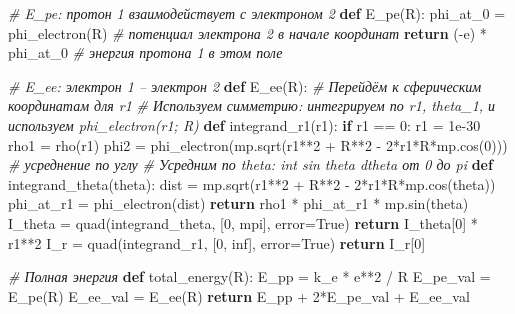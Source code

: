 \documentclass[11pt]{article}
\newenvironment{Shaded}{}{}
\newcommand{\KeywordTok}[1]{\textcolor[rgb]{0.00,0.44,0.13}{\textbf{{#1}}}}
\newcommand{\DecValTok}[1]{\textcolor[rgb]{0.25,0.63,0.44}{{#1}}}
\newcommand{\FloatTok}[1]{\textcolor[rgb]{0.25,0.63,0.44}{{#1}}}
\newcommand{\CommentTok}[1]{\textcolor[rgb]{0.38,0.63,0.69}{\textit{{#1}}}}
\newcommand{\NormalTok}[1]{{#1}}
\newcommand{\VariableTok}[1]{\textcolor[rgb]{0.10,0.09,0.49}{{#1}}}
\newcommand{\ControlFlowTok}[1]{\textcolor[rgb]{0.00,0.44,0.13}{\textbf{{#1}}}}
\newcommand{\OperatorTok}[1]{\textcolor[rgb]{0.40,0.40,0.40}{{#1}}}
\begin{document}
\begin{Shaded}
\begin{Highlighting}[]
\CommentTok{# E_pe: протон 1 взаимодействует с электроном 2}
\KeywordTok{def}\NormalTok{ E_pe(R):}
\NormalTok{    phi_at_0 }\OperatorTok{=}\NormalTok{ phi_electron(R)  }\CommentTok{# потенциал электрона 2 в начале координат}
    \ControlFlowTok{return}\NormalTok{ (}\OperatorTok{-}\NormalTok{e) }\OperatorTok{*}\NormalTok{ phi_at_0  }\CommentTok{# энергия протона 1 в этом поле}

\CommentTok{# E_ee: электрон 1 – электрон 2}
\KeywordTok{def}\NormalTok{ E_ee(R):}
    \CommentTok{# Перейдём к сферическим координатам для r1}
    \CommentTok{# Используем симметрию: интегрируем по r1, theta_1, и используем phi_electron(r1; R)}
    \KeywordTok{def}\NormalTok{ integrand_r1(r1):}
        \ControlFlowTok{if}\NormalTok{ r1 }\OperatorTok{==} \DecValTok{0}\NormalTok{:}
\NormalTok{            r1 }\OperatorTok{=} \FloatTok{1e-30}
\NormalTok{        rho1 }\OperatorTok{=}\NormalTok{ rho(r1)}
\NormalTok{        phi2 }\OperatorTok{=}\NormalTok{ phi_electron(mp.sqrt(r1}\OperatorTok{**}\DecValTok{2} \OperatorTok{+}\NormalTok{ R}\OperatorTok{**}\DecValTok{2} \OperatorTok{-} \DecValTok{2}\OperatorTok{*}\NormalTok{r1}\OperatorTok{*}\NormalTok{R}\OperatorTok{*}\NormalTok{mp.cos(}\DecValTok{0}\NormalTok{)))  }\CommentTok{# усреднение по углу}
        \CommentTok{# Усредним по theta: int sin theta dtheta от 0 до pi}
        \KeywordTok{def}\NormalTok{ integrand_theta(theta):}
\NormalTok{            dist }\OperatorTok{=}\NormalTok{ mp.sqrt(r1}\OperatorTok{**}\DecValTok{2} \OperatorTok{+}\NormalTok{ R}\OperatorTok{**}\DecValTok{2} \OperatorTok{-} \DecValTok{2}\OperatorTok{*}\NormalTok{r1}\OperatorTok{*}\NormalTok{R}\OperatorTok{*}\NormalTok{mp.cos(theta))}
\NormalTok{            phi_at_r1 }\OperatorTok{=}\NormalTok{ phi_electron(dist)}
            \ControlFlowTok{return}\NormalTok{ rho1 }\OperatorTok{*}\NormalTok{ phi_at_r1 }\OperatorTok{*}\NormalTok{ mp.sin(theta)}
\NormalTok{        I_theta }\OperatorTok{=}\NormalTok{ quad(integrand_theta, [}\DecValTok{0}\NormalTok{, mpi], error}\OperatorTok{=}\VariableTok{True}\NormalTok{)}
        \ControlFlowTok{return}\NormalTok{ I_theta[}\DecValTok{0}\NormalTok{] }\OperatorTok{*}\NormalTok{ r1}\OperatorTok{**}\DecValTok{2}
\NormalTok{    I_r }\OperatorTok{=}\NormalTok{ quad(integrand_r1, [}\DecValTok{0}\NormalTok{, inf], error}\OperatorTok{=}\VariableTok{True}\NormalTok{)}
    \ControlFlowTok{return}\NormalTok{ I_r[}\DecValTok{0}\NormalTok{]}

\CommentTok{# Полная энергия}
\KeywordTok{def}\NormalTok{ total_energy(R):}
\NormalTok{    E_pp }\OperatorTok{=}\NormalTok{ k_e }\OperatorTok{*}\NormalTok{ e}\OperatorTok{**}\DecValTok{2} \OperatorTok{/}\NormalTok{ R}
\NormalTok{    E_pe_val }\OperatorTok{=}\NormalTok{ E_pe(R)}
\NormalTok{    E_ee_val }\OperatorTok{=}\NormalTok{ E_ee(R)}
    \ControlFlowTok{return}\NormalTok{ E_pp }\OperatorTok{+} \DecValTok{2}\OperatorTok{*}\NormalTok{E_pe_val }\OperatorTok{+}\NormalTok{ E_ee_val}


\end{Highlighting}
\end{Shaded}
\end{document}
